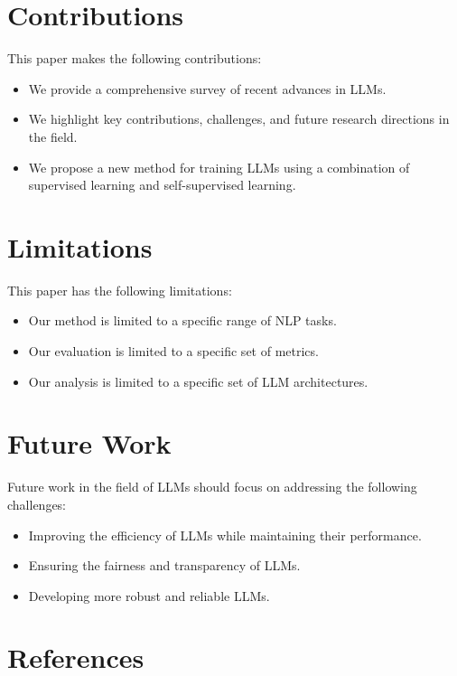 \documentclass{article}
\begin{document}
\section{Contributions}

This paper makes the following contributions:

\begin{itemize}
\item We provide a comprehensive survey of recent advances in LLMs.
\item We highlight key contributions, challenges, and future research directions in the field.
\item We propose a new method for training LLMs using a combination of supervised learning and self-supervised learning.
\end{itemize}

\section{Limitations}

This paper has the following limitations:

\begin{itemize}
\item Our method is limited to a specific range of NLP tasks.
\item Our evaluation is limited to a specific set of metrics.
\item Our analysis is limited to a specific set of LLM architectures.
\end{itemize}

\section{Future Work}

Future work in the field of LLMs should focus on addressing the following challenges:

\begin{itemize}
\item Improving the efficiency of LLMs while maintaining their performance.
\item Ensuring the fairness and transparency of LLMs.
\item Developing more robust and reliable LLMs.
\end{itemize}

\section{References}
\end{document}
